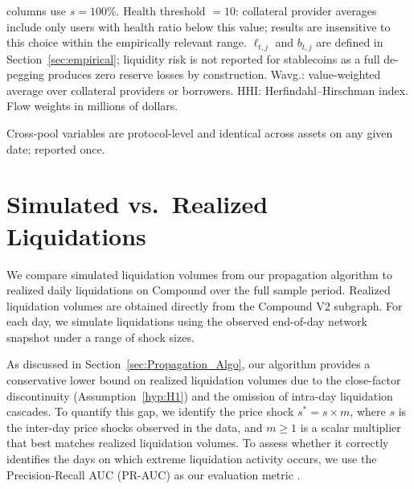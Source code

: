 \documentclass[a4paper,UKenglish,cleveref, autoref, thm-restate]{informs3}
\begin{document}
\begin{table}[ht]
\begin{threeparttable}
\begin{tablenotes}[flushleft]
columns use $s = 100\%$. Health threshold $= 10$: collateral
provider averages include only users with health ratio below
this value; results are insensitive to this choice within
the empirically relevant range. $\ell_{t,j}$ and $b_{t,j}$
are defined in Section~\ref{sec:empirical}; liquidity risk
is not reported for stablecoins as a full de-pegging
produces zero reserve losses by construction. Wavg.:
value-weighted average over collateral providers or
borrowers. HHI: Herfindahl--Hirschman index. Flow weights
in millions of dollars.
\item[$a$] Cross-pool variables are protocol-level and
identical across assets on any given date; reported once.
\end{tablenotes}
\end{threeparttable}
\end{table}

\FloatBarrier
\section{Simulated vs.\ Realized Liquidations}
\label{app:data_model}

\medskip

We compare simulated liquidation 
volumes from our propagation algorithm to realized 
daily liquidations on Compound over the full sample 
period. Realized liquidation volumes are obtained 
directly from the Compound V2 subgraph. For each day, 
we simulate liquidations using the observed end-of-day 
network snapshot under a range of shock sizes.

As discussed in Section~\ref{sec:Propagation_Algo}, our algorithm provides a conservative lower bound on realized liquidation volumes due to the close-factor discontinuity (Assumption~\ref{hyp:H1}) and the omission of intra-day liquidation cascades. To quantify this gap, we identify the price shock $s^* = s \times m$, where $s$ is the inter-day price shocks observed in the data, and $m \geq 1$ is a scalar multiplier that best matches realized liquidation volumes. 
To assess whether it correctly identifies the days on which extreme liquidation activity occurs, we use the Precision-Recall AUC 
(PR-AUC) as our evaluation metric \citep{beutel2019machine, davis2006relationship, saito2015precision}.
\end{document}
